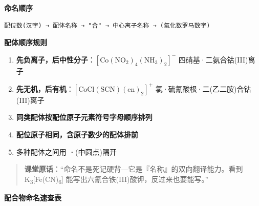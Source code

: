 \textbf{命名顺序}

\begin{verbatim}
配位数(汉字) → 配体名称 → "合" → 中心离子名称 → (氧化数罗马数字)
\end{verbatim}

\textbf{配体顺序规则}

\begin{enumerate}
\def\labelenumi{\arabic{enumi}.}
\tightlist
\item
  \textbf{先负离子，后中性分子}：\([\mathrm{Co(NO_2)_4(NH_3)_2}]^-\) \箭 四硝基·二氨合钴(III)离子
\item
  \textbf{先无机，后有机}：\([\mathrm{CoCl(SCN)(en)_2}]^+\) \箭 氯·硫氰酸根·二(乙二胺)合钴(III)离子
\item
  \textbf{同类配体按配位原子元素符号字母顺序排列}
\item
  \textbf{配位原子相同，含原子数少的配体排前}
\item
  多种配体之间用 \textbf{·}(中圆点)隔开
\end{enumerate}

\begin{quote}
\textbf{课堂原话}：``命名不是死记硬背---它是『名称』的双向翻译能力。看到 K\textsubscript{3}{[}Fe(CN)\textsubscript{6}{]} 能写出六氰合铁(III)酸钾，反过来也要能写。''
\end{quote}

\textbf{配合物命名速查表}

